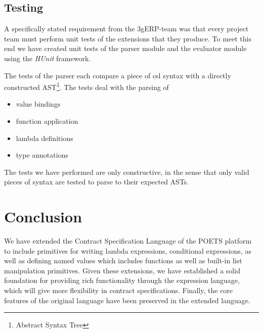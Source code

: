 \documentclass[10pt,a4paper,final,oneside,openany,article]{memoir}
\begin{document}

\section{Testing}
\label{tests}
A specifically stated requirement from the 3gERP-team was that every
project team must perform unit tests of the extensions that they
produce. To meet this end we have created unit tests of the parser
module and the evaluator module using the \emph{HUnit} framework.

The tests of the parser each compare a piece of csl syntax with a
directly constructed AST\footnote{Abstract Syntax Tree}.  The tests
deal with the parsing of

\begin{itemize}

  \item value bindings

  \item function application

  \item lambda definitions

  \item type annotations

\end{itemize}

The tests we have performed are only constructive, in the sense that
only valid pieces of syntax are tested to parse to their expected
ASTs.

\chapter{Conclusion}
We have extended the Contract Specification Language of the POETS
platform to include primitives for writing lambda expressions,
conditional expressions, as well as defining named values which includes
functions as well as built-in list manipulation primitives. Given these
extensions, we have established a solid foundation for providing rich
functionality through the expression language, which will give more
flexibility in contract specifications.
Finally, the core features of the original language \cite[page
4]{hvitved10} have been preserved in the extended language.

\end{document}
